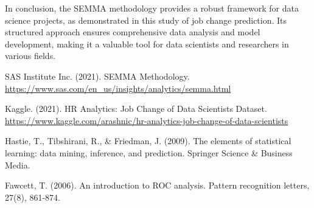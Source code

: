 \documentclass[12pt]{article}
\begin{document}
In conclusion, the SEMMA methodology provides a robust framework for data science projects, as demonstrated in this study of job change prediction. Its structured approach ensures comprehensive data analysis and model development, making it a valuable tool for data scientists and researchers in various fields.


\begin{thebibliography}{9}

SAS Institute Inc. (2021). SEMMA Methodology.
\url{https://www.sas.com/en_us/insights/analytics/semma.html}

Kaggle. (2021). HR Analytics: Job Change of Data Scientists Dataset.
\url{https://www.kaggle.com/arashnic/hr-analytics-job-change-of-data-scientists}

Hastie, T., Tibshirani, R., \& Friedman, J. (2009). The elements of statistical learning: data mining, inference, and prediction. Springer Science \& Business Media.

Fawcett, T. (2006). An introduction to ROC analysis. Pattern recognition letters, 27(8), 861-874.

\end{thebibliography}
\end{document}
